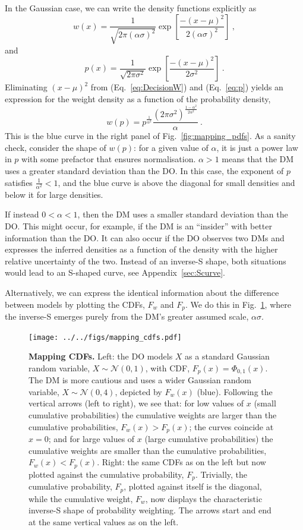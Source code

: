 \documentclass[12pt,letter,timesnewroman]{article}
\newcommand{\elabel}[1]{\label{eq:#1}}
\newcommand{\eref}[1]{(Eq.~\ref{eq:#1})}
\newcommand{\flabel}[1]{\label{fig:#1}}
\newcommand{\fref}[1]{Fig.~\ref{fig:#1}}
\newcommand{\Appref}[1]{Appendix~\ref{sec:#1}}
\newcommand{\be}{\begin{equation}}
\newcommand{\ee}{\end{equation}}
\newcommand{\ND}{\mathcal{N}} %
\begin{document}
In the Gaussian case, we can write the density functions explicitly as
\be
w(x)=\frac{1}{\sqrt{2\pi (\alpha \sigma)^2}}\exp\left[\frac{-(x -\mu )^2}{2 (\alpha \sigma)^2}\right]~,
\elabel{DecisionW}
\ee
and
\be
p(x)=\frac{1}{\sqrt{2\pi \sigma^2}}\exp\left[\frac{-(x -\mu )^2}{2 \sigma^2}\right] ~.
\elabel{p}
\ee
Eliminating $(x-\mu)^2$ from \eref{DecisionW} and \eref{p} yields an expression for the weight density as a function of the probability density,
\be
w(p)= p^{\frac{1}{\alpha^2}} \frac{\left(2\pi\sigma^2\right)^{\frac{1-\alpha^2}{2\alpha^2}}}{\alpha} ~.
\elabel{w_of_p}
\ee
This is the blue curve in the right panel of \fref{mapping_pdfs}. As a sanity check, consider the shape of $w(p)$: for a given value of $\alpha$, it is just a power law in $p$ with some prefactor that ensures normalisation. $\alpha>1$ means that the DM uses a greater standard deviation than the DO. In this case, the exponent of $p$ satisfies $\frac{1}{\alpha^2}<1$, and the blue curve is above the diagonal for small densities and below it for large densities.

If instead $0<\alpha<1$, then the DM uses a smaller standard deviation than the DO. This might occur, for example, if the DM is an ``insider'' with better information than the DO. It can also occur if the DO observes two DMs and expresses the inferred densities as a function of the density with the higher relative uncertainty of the two.
Instead of an inverse-S shape, both situations	 would lead to an S-shaped curve, see \Appref{Scurve}.

Alternatively, we can express the identical information about the difference between models by plotting the CDFs, $F_w$ and $F_p$. We do this in \fref{mapping_cdfs}, where the inverse-S emerges purely from the DM's greater assumed scale, $\alpha \sigma$.
\begin{figure}[!htb]
\centering
\texttt{[image: ../../figs/mapping\_cdfs.pdf]}
\caption{\textbf{Mapping CDFs.}
Left: the DO models $X$ as a standard Gaussian random variable, $X \sim \ND(0,1)$, with CDF, $F_p(x) = \Phi_{0,1}(x)$. The DM is more cautious and uses a wider Gaussian random variable, $X \sim \ND(0,4)$, depicted by $F_w(x)$ (blue).
Following the vertical arrows (left to right), we see that: for low values of $x$ (small cumulative probabilities) the cumulative weights are larger than the cumulative probabilities, $F_w(x) > F_p(x)$; the curves coincide at $x=0$; and for large values of $x$ (large cumulative probabilities) the cumulative weights are smaller than the cumulative probabilities, $F_w(x) < F_p(x)$.
Right: the same CDFs as on the left but now plotted against the cumulative probability, $F_p$. Trivially, the cumulative probability, $F_p$, plotted against itself is the diagonal, while the cumulative weight, $F_w$, now displays the characteristic inverse-S shape of probability weighting. The arrows start and end at the same vertical values as on the left.
}
\flabel{mapping_cdfs}
\end{figure}
\end{document}
